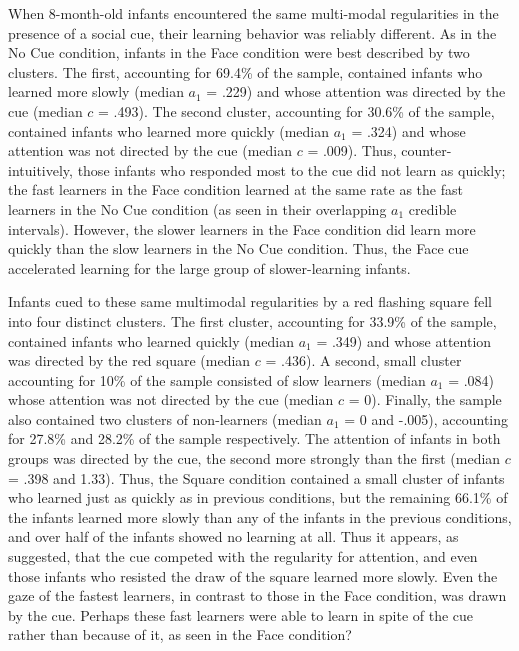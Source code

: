\documentclass[12pt]{article}
\begin{document}
	When 8-month-old infants encountered the same multi-modal regularities in the presence of a social cue, their learning behavior was reliably different. As in the No Cue condition, infants in the Face condition were best described by two clusters. The first, accounting for 69.4\% of the sample, contained infants who learned more slowly (median $a_{1}$ = .229) and whose attention was directed by the cue (median $c$ = .493). The second cluster, accounting for 30.6\% of the sample, contained infants who learned more quickly (median $a_{1}$ = .324) and whose attention was not directed by the cue (median $c$ = .009). Thus, counter-intuitively, those infants who responded most to the cue did not learn as quickly; the fast learners in the Face condition learned at the same rate as the fast learners in the No Cue condition (as seen in their overlapping $a_{1}$ credible intervals). However, the slower learners in the Face condition did learn more quickly than the slow learners in the No Cue condition. Thus, the Face cue accelerated learning for the large group of slower-learning infants.

	Infants cued to these same multimodal regularities by a red flashing square fell into four distinct clusters. The first cluster, accounting for 33.9\% of the sample, contained infants who learned quickly (median $a_{1}$ = .349) and whose attention was directed by the red square (median $c$ = .436). A second, small cluster accounting for 10\% of the sample consisted of slow learners (median $a_{1}$ = .084) whose attention was not directed by the cue (median $c$ = 0). Finally, the sample also contained two clusters of non-learners (median $a_{1}$ = 0 and -.005), accounting for 27.8\% and 28.2\% of the sample respectively. The attention of infants in both groups was directed by the cue, the second more strongly than the first (median $c$ = .398 and 1.33). Thus, the Square condition contained a small cluster of infants who learned just as quickly as in previous conditions, but the remaining 66.1\% of the infants learned more slowly than any of the infants in the previous conditions, and over half of the infants showed no learning at all. Thus it appears, as \cite{Wu2010a} suggested, that the cue competed with the regularity for attention, and even those infants who resisted the draw of the square learned more slowly. Even the gaze of the fastest learners, in contrast to those in the Face condition, was drawn by the cue. Perhaps these fast learners were able to learn in spite of the cue rather than because of it, as seen in the Face condition? 
\end{document}
